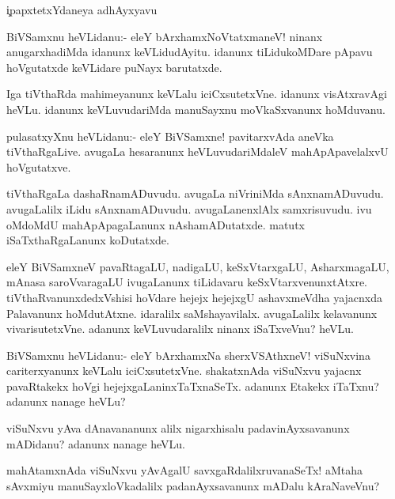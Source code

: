 \c{ipapxtetxYdaneya adhAyxyavu}

\begin{mng}
BiVSamxnu heVLidanu:- eleY bArxhamxNoVtatxmaneV! ninanx anugarxhadiMda idanunx keVLidudAyitu. idanunx tiLidukoMDare pApavu hoVgutatxde keVLidare puNayx barutatxde.
\end{mng}

\begin{mng}
Iga tiVthaRda mahimeyanunx keVLalu iciCxsutetxVne. idanunx visAtxravAgi heVLu. idanunx keVLuvudariMda manuSayxnu moVkaSxvanunx hoMduvanu.
\end{mng}

\begin{mng}
pulasatxyXnu heVLidanu:- eleY BiVSamxne! pavitarxvAda aneVka tiVthaRgaLive. avugaLa hesaranunx heVLuvudariMdaleV mahApApavelalxvU hoVgutatxve.
\end{mng}

\begin{mng}
tiVthaRgaLa dashaRnamADuvudu. avugaLa niVriniMda sAnxnamADuvudu. avugaLalilx iLidu sAnxnamADuvudu. avugaLanenxlAlx samxrisuvudu. ivu oMdoMdU mahApApagaLanunx nAshamADutatxde. matutx iSaTxthaRgaLanunx koDutatxde.
\end{mng}

\begin{mng}
eleY BiVSamxneV pavaRtagaLU, nadigaLU, keSxVtarxgaLU, AsharxmagaLU, mAnasa saroVvaragaLU ivugaLanunx tiLidavaru keSxVtarxvenunxtAtxre. tiVthaRvanunxdedxVshisi hoVdare hejejx hejejxgU ashavxmeVdha yajacnxda Palavanunx hoMdutAtxne. idaralilx saMshayavilalx. avugaLalilx kelavanunx vivarisutetxVne. adanunx keVLuvudaralilx ninanx iSaTxveVnu? heVLu.
\end{mng}

\begin{mng}
BiVSamxnu heVLidanu:- eleY bArxhamxNa sherxVSAthxneV! viSuNxvina cariterxyanunx keVLalu iciCxsutetxVne. shakatxnAda viSuNxvu yajacnx pavaRtakekx hoVgi hejejxgaLaninxTaTxnaSeTx. adanunx Etakekx iTaTxnu? adanunx nanage heVLu?
\end{mng}

\begin{mng}
viSuNxvu yAva dAnavananunx alilx nigarxhisalu padavinAyxsavanunx mADidanu? adanunx nanage heVLu.
\end{mng}

\begin{mng}
mahAtamxnAda viSuNxvu yAvAgalU savxgaRdalilxruvanaSeTx! aMtaha sAvxmiyu manuSayxloVkadalilx padanAyxsavanunx mADalu kAraNaveVnu?
\end{mng}

